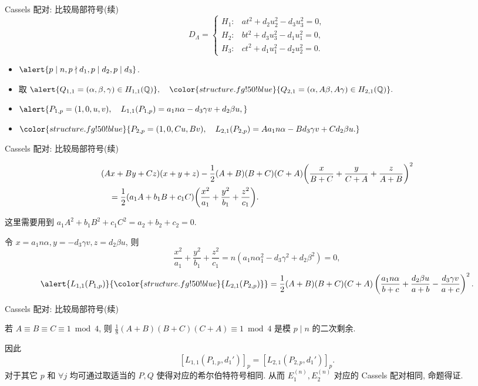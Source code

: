 \documentclass[aspectratio=169,handout]{ctexbeamer}
\renewcommand\emph[1]{{\color{structure.fg!50!blue}{#1}}}
\begin{document}
\begin{frame}{Cassels 配对: 比较局部符号(续)}
\[D_\Lambda=
\begin{cases}
	H_1:& at^2+d_2u_2^2-d_3u_3^2=0,\\
	H_2:& bt^2+d_3u_3^2-d_1u_1^2=0,\\
	H_3:& ct^2+d_1u_1^2-d_2u_2^2=0.
\end{cases}\]
\onslide<+->
\begin{itemize}
\item $\alert{p\mid n,p\nmid d_1,p\mid d_2,p\mid d_3}$.
\item 取 $\alert{Q_{1,1}=(\alpha,\beta,\gamma)\in H_{1,1}(\BQ)},\quad
\emph{Q_{2,1}=(\alpha,A\beta,A\gamma)\in H_{2,1}(\BQ)}.$
\item $\alert{P_{1,p}=(1,0,u,v),\quad
L_{1,1}(P_{1,p})=a_1n\alpha-d_3\gamma v+d_2\beta u,}$
\item $\emph{P_{2,p}=(1,0,Cu,Bv),\quad
L_{2,1}(P_{2,p})=Aa_1n\alpha-Bd_3\gamma v+Cd_2\beta u.}$
\end{itemize}
\end{frame}



\begin{frame}{Cassels 配对: 比较局部符号(续)}
\begin{lemma}
	\[\begin{split}
	&(Ax+By+Cz)(x+y+z)-\frac{1}{2}(A+B)(B+C)(C+A)\biggl(
	\frac x{B+C}+
	\frac y{C+A}+
	\frac z{A+B}\biggr)^2\\
	&\quad=\frac{1}{2}(a_1A+b_1B+c_1C)\biggl(\frac{x^2}{a_1}+\frac{y^2}{b_1}+\frac{z^2}{c_1}\biggr).
	\end{split}\]
\end{lemma}
\onslide<+->
这里需要用到 $a_1A^2+b_1B^2+c_1C^2=a_2+b_2+c_2=0$.

\onslide<+->
令 $x=a_1n\alpha,y=-d_3\gamma v, z=d_2\beta u$, 则
\[\frac{x^2}{a_1}+\frac{y^2}{b_1}+\frac{z^2}{c_1}=n(a_1n\alpha_1^2-d_3\gamma^2+d_2\beta^2)=0,\]
\onslide<+->
\[\alert{L_{1,1}(P_{1,p})}\emph{L_{2,1}(P_{2,p})}=\frac12{(A+B)(B+C)(C+A)}\left(\frac{a_1n\alpha}{b+c}+\frac{d_2\beta u}{a+b}-\frac{d_3\gamma v}{a+c}\right)^2.\]
\end{frame}


\begin{frame}{Cassels 配对: 比较局部符号(续)}
\onslide<+->
\begin{lemma}
若 $A\equiv B\equiv C\equiv 1\bmod 4$, 则 $\frac18(A+B)(B+C)(C+A)\equiv 1\bmod 4$ 是模 $p\mid n$ 的二次剩余.
\end{lemma}
\onslide<+->
因此
\[[L_{1,1}(P_{1,p},d_1')]_p=[L_{2,1}(P_{2,p},d_1')]_p.\]
\onslide<+->
对于其它 $p$ 和 $\forall j$ 均可通过取适当的 $P,Q$ 使得对应的希尔伯特符号相同.
\onslide<+->
从而 $E_1^{(n)},E_2^{(n)}$ 对应的 Cassels 配对相同, 命题得证.
\end{frame}
\end{document}

